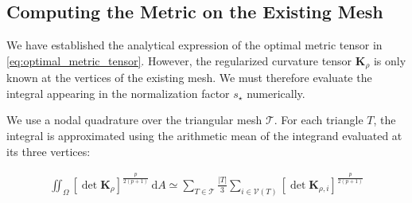 \documentclass[11pt,a4paper]{article}
\begin{document}








\subsection{Computing the Metric on the Existing Mesh}
\label{subsec:discrete_metric}

\noindent We have established the analytical expression
of the optimal metric tensor in
\eqref{eq:optimal_metric_tensor}. However, the
regularized curvature tensor $\mathbf K_\rho$ is
only known at the vertices of the existing mesh.
We must therefore evaluate the integral appearing
in the normalization factor $s_\star$ numerically.

\medskip

\noindent We use a nodal quadrature over the triangular
mesh $\mathcal T$. For each triangle $T$, the integral
is approximated using the arithmetic mean of the
integrand evaluated at its three vertices:

\begin{equation}
    \begin{aligned}
    \iint_\Omega
    \left[\det\mathbf K_\rho\right]^{
        \frac{p}{2(p+1)}
    }
    \,\mathrm{d}A
    \simeq
    \sum_{T\in\mathcal T}
    \frac{|T|}{3}
    \sum_{i\in\mathcal V(T)}
    \left[\det\mathbf K_{\rho,i}\right]^{
        \frac{p}{2(p+1)}
    }
    \end{aligned}
\end{equation}
\end{document}
